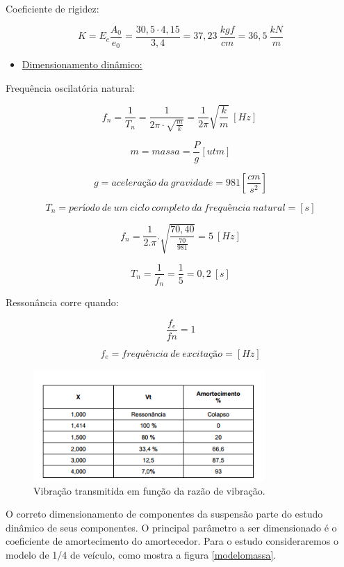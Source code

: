\noindent Coeficiente de rigidez:

\[K = E_c\frac{A_0}{e_0} = \frac{30,5 \cdot 4,15}{3,4} = 37,23 \ \frac{kgf}{cm} = 36,5 \ \frac{kN}{m} \]

\begin{itemize}
	\item \underline{Dimensionamento dinâmico:}
\end{itemize}

\noindent Frequência oscilatória natural:

\[f_n = \frac{1}{T_n} = \frac{1}{2 \pi \cdot \sqrt{\frac{m}{k}}} = \frac{1}{2\pi}\sqrt{\frac{k}{m}} \ \left[Hz\right]\ \]

\[m = massa = \frac{P}{g} \left[utm\right]\] 

\[g = acelera\textrm{\c{c}}\textrm{\~{a}}o\ da\ gravidade=981\left[\frac{cm}{s^2}\right]\] 

\[T_n=per\textrm{\'{i}}odo\ de\ um\ ciclo\ completo\ da\ frequ\textrm{\^{e}}ncia\ natural=[s]\] 

\[f_n=\frac{1}{2.\pi }.\sqrt{\frac{70,40}{\frac{70}{981}}}=5\ \left[Hz\right]\] 

\[T_n=\frac{1}{f_n}=\frac{1}{5}=0,2\ [s]\] 

\noindent Ressonância corre quando:

\[\frac{f_e}{fn}=1\] 

\[f_e=frequ\textrm{\^{e}}ncia\ de\ excita\textrm{\c{c}}\textrm{\~{a}}o=\left[Hz\right]\] 

\begin{figure}[H]
	\centering
	\includegraphics[width=250pt]{figuras/vibracao_transmitida.png}
	\caption{Vibração transmitida em função da razão de vibração.}
\end{figure}

O correto dimensionamento de componentes da suspensão parte do estudo dinâmico de seus componentes. O principal parâmetro a ser dimensionado é o coeficiente de amortecimento do amortecedor. Para o estudo consideraremos o modelo de 1/4 de veículo, como mostra a figura \ref{modelomassa}.

